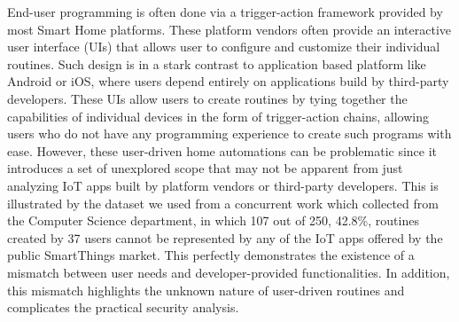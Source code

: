 
End-user programming is often done via a trigger-action framework provided by most Smart Home platforms. These platform vendors often provide an interactive user interface (UIs) that allows user to configure and customize their individual routines. Such design is in a stark contrast to application based platform like Android or iOS, where users depend entirely on applications build by third-party developers. These UIs allow users to create routines by tying together the capabilities of individual devices in the form of trigger-action chains, allowing users who do not have any programming experience to create such programs with ease. However, these user-driven home automations can be problematic since it introduces a set of unexplored scope that may not be apparent from just analyzing IoT apps built by platform vendors or third-party developers. This is illustrated by the dataset we used from a concurrent work which collected from the Computer Science department, in which 107 out of 250, 42.8\%, routines created by 37 users cannot be represented by any of the IoT apps offered by the public SmartThings market. This perfectly demonstrates the existence of a mismatch between user needs and developer-provided functionalities. In addition, this mismatch highlights the unknown nature of user-driven routines and complicates the practical security analysis.


